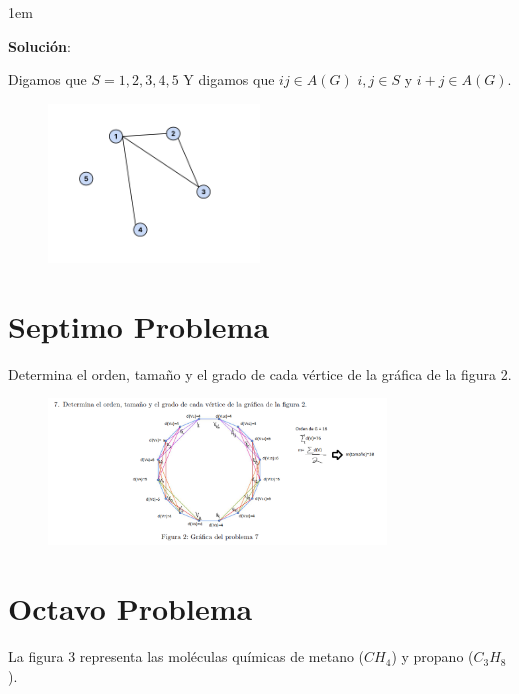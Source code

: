 \documentclass[journal,12pt,onecolumn]{IEEEtran}                %
\newenvironment{SmallIndentation}[1][0.75em]                    %
        {\begin{adjustwidth}{#1}{}\begin{footnotesize}}             %
        {\end{footnotesize}\end{adjustwidth}}                       %
\theoremstyle{break}                                            %
\begin{document}
        \begin{SmallIndentation}[1em]
            \textbf{Solución}:

            Digamos que $S = {1, 2, 3, 4, 5}$
            Y digamos que $ij \in A(G)$ $i, j \in S$ y $i + j \in A(G)$.

            \begin{figure}[h]
                \includegraphics[width=0.5\textwidth]{6}
            \end{figure}

        \end{SmallIndentation}

    \section*{Septimo Problema}

        Determina el orden, tamaño y el grado de cada vértice de la gráfica de la figura 2.

        \begin{figure}[h]
            \includegraphics[width=0.8\textwidth]{7}
        \end{figure}

    \clearpage
    \section*{Octavo Problema}
        La figura 3 representa las moléculas químicas de metano ($CH_4$) y propano ($C_3H_8$).
\end{document}
